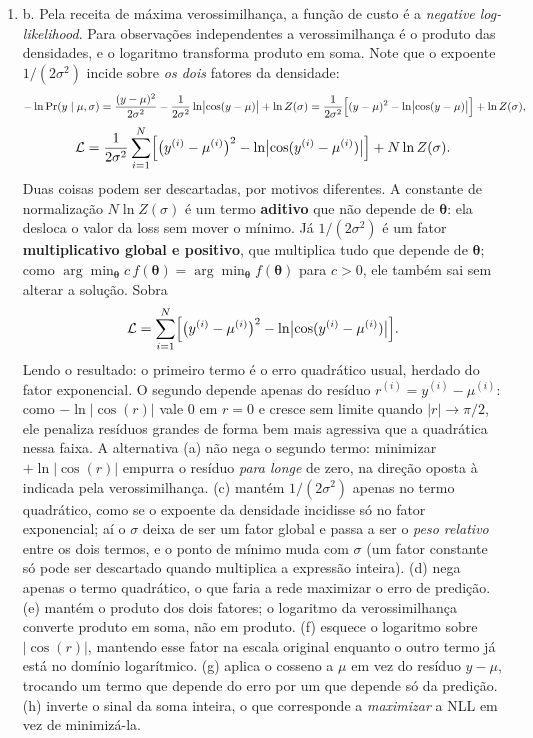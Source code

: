 \documentclass{dlproblemset}
\begin{document}
\begin{enumerate}[1)]
    \item b. Pela receita de máxima verossimilhança, a função de custo é a \textit{negative log-likelihood}. Para observações independentes a verossimilhança é o produto das densidades, e o logaritmo transforma produto em soma. Note que o expoente $1/(2\sigma^2)$ incide sobre \emph{os dois} fatores da densidade:
    \[
    -\ln \Pr(y \mid \mu, \sigma)
     = \frac{(y - \mu)^2}{2\sigma^2} - \frac{1}{2\sigma^2}\ln\bigl|\cos(y - \mu)\bigr| + \ln Z(\sigma)
     = \frac{1}{2\sigma^2}\Bigl[ (y - \mu)^2 - \ln\bigl|\cos(y - \mu)\bigr| \Bigr] + \ln Z(\sigma),
    \]
    \[
    \mathcal{L} = \frac{1}{2\sigma^2}\sum_{i=1}^{N} \Bigl[ \bigl(y^{(i)} - \mu^{(i)}\bigr)^2 - \ln\bigl|\cos(y^{(i)} - \mu^{(i)})\bigr| \Bigr] + N\ln Z(\sigma).
    \]
    Duas coisas podem ser descartadas, por motivos diferentes. A constante de normalização $N \ln Z(\sigma)$ é um termo \textbf{aditivo} que não depende de $\boldsymbol{\theta}$: ela desloca o valor da loss sem mover o mínimo. Já $1/(2\sigma^2)$ é um fator \textbf{multiplicativo global e positivo}, que multiplica tudo que depende de $\boldsymbol{\theta}$; como $\arg\min_{\boldsymbol{\theta}} c\,f(\boldsymbol{\theta}) = \arg\min_{\boldsymbol{\theta}} f(\boldsymbol{\theta})$ para $c > 0$, ele também sai sem alterar a solução. Sobra
    \[
    \mathcal{L} = \sum_{i=1}^{N} \Bigl[ \bigl(y^{(i)} - \mu^{(i)}\bigr)^2 - \ln\bigl|\cos(y^{(i)} - \mu^{(i)})\bigr| \Bigr].
    \]
    Lendo o resultado: o primeiro termo é o erro quadrático usual, herdado do fator exponencial. O segundo depende apenas do resíduo $r^{(i)} = y^{(i)} - \mu^{(i)}$: como $-\ln|\cos(r)|$ vale $0$ em $r = 0$ e cresce sem limite quando $|r| \to \pi/2$, ele penaliza resíduos grandes de forma bem mais agressiva que a quadrática nessa faixa. A alternativa (a) não nega o segundo termo: minimizar $+\ln|\cos(r)|$ empurra o resíduo \emph{para longe} de zero, na direção oposta à indicada pela verossimilhança. (c) mantém $1/(2\sigma^2)$ apenas no termo quadrático, como se o expoente da densidade incidisse só no fator exponencial; aí o $\sigma$ deixa de ser um fator global e passa a ser o \emph{peso relativo} entre os dois termos, e o ponto de mínimo muda com $\sigma$ (um fator constante só pode ser descartado quando multiplica a expressão inteira). (d) nega apenas o termo quadrático, o que faria a rede maximizar o erro de predição. (e) mantém o produto dos dois fatores; o logaritmo da verossimilhança converte produto em soma, não em produto. (f) esquece o logaritmo sobre $|\cos(r)|$, mantendo esse fator na escala original enquanto o outro termo já está no domínio logarítmico. (g) aplica o cosseno a $\mu$ em vez do resíduo $y - \mu$, trocando um termo que depende do erro por um que depende só da predição. (h) inverte o sinal da soma inteira, o que corresponde a \emph{maximizar} a NLL em vez de minimizá-la.


\end{enumerate}
\end{document}
